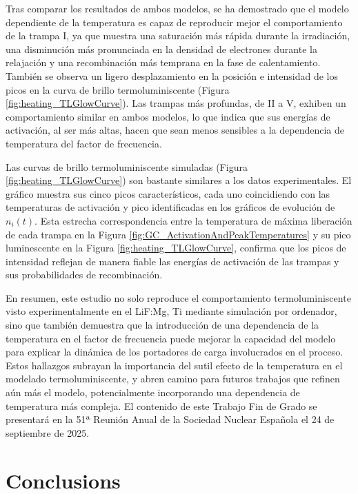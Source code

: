 Tras comparar los resultados de ambos modelos, se ha demostrado que el modelo dependiente de la temperatura es capaz de reproducir mejor el comportamiento de la trampa I, ya que muestra una saturación más rápida durante la irradiación, una disminución más pronunciada en la densidad de electrones durante la relajación y una recombinación más temprana en la fase de calentamiento. También se observa un ligero desplazamiento en la posición e intensidad de los picos en la curva de brillo termoluminiscente (Figura \ref{fig:heating_TLGlowCurve}). Las trampas más profundas, de II a V, exhiben un comportamiento similar en ambos modelos, lo que indica que sus energías de activación, al ser más altas, hacen que sean menos sensibles a la dependencia de temperatura del factor de frecuencia.

\vspace{10pt}

Las curvas de brillo termoluminiscente simuladas (Figura \ref{fig:heating_TLGlowCurve}) son bastante similares a los datos experimentales. El gráfico muestra sus cinco picos característicos, cada uno coincidiendo con las temperaturas de activación y pico identificadas en los gráficos de evolución de $n_i(t)$. Esta estrecha correspondencia entre la temperatura de máxima liberación de cada trampa en la Figura \ref{fig:GC_ActivationAndPeakTemperatures} y su pico luminescente en la Figura \ref{fig:heating_TLGlowCurve}, confirma que los picos de intensidad reflejan de manera fiable las energías de activación de las trampas y sus probabilidades de recombinación.

\vspace{10pt}

En resumen, este estudio no solo reproduce el comportamiento termoluminiscente visto experimentalmente en el LiF:Mg, Ti mediante simulación por ordenador, sino que también demuestra que la introducción de una dependencia de la temperatura en el factor de frecuencia puede mejorar la capacidad del modelo para explicar la dinámica de los portadores de carga involucrados en el proceso. Estos hallazgos subrayan la importancia del sutil efecto de la temperatura en el modelado termoluminiscente, y abren camino para futuros trabajos que refinen aún más el modelo, potencialmente incorporando una dependencia de temperatura más compleja. El contenido de este Trabajo Fin de Grado se presentará en la 51ª Reunión Anual de la Sociedad Nuclear Española el 24 de septiembre de 2025.


\chapter*{Conclusions}

